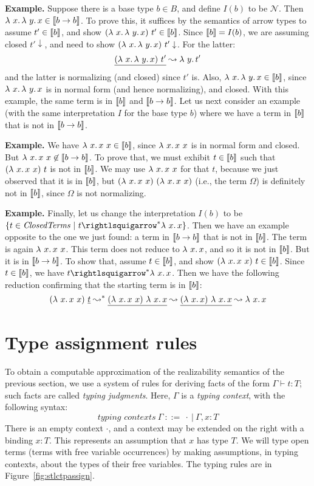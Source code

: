 \textbf{Example.} Suppose there is a base type $b\in B$, and define $I(b)$ to be $\mathcal{N}$.
Then  $\lambda\ x.\, \lambda\ y.\, x \in \llbracket b \to b \rrbracket$.  To prove this, it suffices by the semantics
  of arrow types to assume $t'\in \llbracket b \rrbracket$, and
  show $(\lambda\ x.\, \lambda\ y.\, x)\ t' \in \llbracket b \rrbracket$.  Since $\llbracket b \rrbracket = I(b)$,
  we are assuming closed $t' \downarrow$, and need to show $(\lam{x}{\lam{y}{x}})\ t'\downarrow$.
  For the latter:
  \[
  \underline{(\lambda\ x.\, \lambda\ y.\, x)\ t'} \leadsto \lambda\ y.\, t'
  \]
  \noindent and the latter is normalizing (and closed) since $t'$ is. Also, $\lambda\ x.\, \lambda\ y.\, x \in \llbracket b \rrbracket$, since $\lambda\ x.\, \lambda\ y.\, x$ is in normal
  form (and hence normalizing), and closed. With this example, the same term is in $\llbracket b \rrbracket$ and $\llbracket b \to b \rrbracket$.
  Let us next consider an example (with the same interpretation $I$ for the base type $b$) where we have a term in $\llbracket b \rrbracket$ that is not in $\llbracket b \to b \rrbracket$.

  \textbf{Example.} We have
 $\lambda\ x.\, x\ x \in \llbracket b \rrbracket$, since $\lambda\ x.\, x\ x$ is in normal form and closed.
 But $\lambda\ x.\, x\ x \not\in \llbracket b \to b \rrbracket$.  To prove that, we must exhibit $t \in \llbracket b \rrbracket$ such
  that $(\lam{x}{x\ x})\ t$ is not in $\llbracket b \rrbracket$.  We may use $\lambda\ x.\, x\ x$ for that $t$, because
  we just observed that it is in $\llbracket b \rrbracket$, but $(\lambda\ x.\, x\ x)\ (\lambda\ x.\, x\ x)$ (i.e., the term $\Omega$) is definitely
  not in $\llbracket b \rrbracket$, since $\Omega$ is not normalizing.


\textbf{Example.} Finally, let us change the interpretation $I(b)$ to be $\{ t \in\textit{ClosedTerms}\ |\ t \betaa^* \lam{x}{x}\}$.  Then we
have an example opposite to the one we just found: a term in $\llbracket b\to b \rrbracket$ that is not in $\llbracket b \rrbracket$.
The term is again $\lambda\ x.\, x\ x$.  This term does not reduce to $\lambda\ x.\, x$, and so it is not in $\llbracket b \rrbracket$.
But it is in $\llbracket b \to b \rrbracket$.  To show that, assume $t\in\llbracket b \rrbracket$, and show $(\lambda\ x.\, x\ x)\ t\in\llbracket b \rrbracket$.
Since $t\in\llbracket b \rrbracket$, we have $t\betaa^*\lam{x}{x}$.  Then we have the following reduction confirming
that the starting term is in $\llbracket b \rrbracket$:
\[
(\lambda\ x.\, x\ x)\ \underline{t} \leadsto^* \underline{(\lambda\ x.\, x\ x)\ \lambda\ x.\, x} \leadsto \underline{(\lambda\ x.\, x)\ \lambda\ x.\, x} \leadsto \lambda\ x.\, x
\]


\section{Type assignment rules}

To obtain a computable approximation of the realizability semantics of the previous section,
we use a system of rules for deriving facts of the form $\Gamma \vdash t : T$; such facts
are called \emph{typing judgments}.  Here, $\Gamma$
is a \emph{typing context}, with the following syntax:
\[
\textit{typing contexts}\ \Gamma\ ::=\ \cdot\ |\ \Gamma , x : T
\]
\noindent There is an empty context $\cdot$, and a context may be
extended on the right with a binding $x : T$.  This represents an
assumption that $x$ has type $T$.  We will type open terms (terms with
free variable occurrences) by making assumptions, in typing contexts,
about the types of their free variables.  The typing rules are in Figure~\ref{fig:stlctpassign}.

